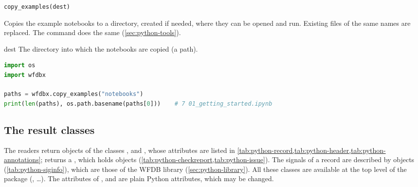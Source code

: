 \begin{lstlisting}[language=Python,style=signature]
copy_examples(dest)
\end{lstlisting}
Copies the example notebooks to a directory, created if needed, where they can be opened
and run. Existing files of the same names are replaced. The command  does the same (\cref{sec:python-tools}).
\begin{params}
\item[dest] The directory into which the notebooks are copied (a path).
\end{params}
\begin{lstlisting}[language=Python,style=example]
import os
import wfdbx

paths = wfdbx.copy_examples("notebooks")
print(len(paths), os.path.basename(paths[0]))    # 7 01_getting_started.ipynb
\end{lstlisting}

\subsection{The result classes}
\label{sec:python-results}

The readers return objects of the classes ,  and
, whose attributes are listed in
\cref{tab:python-record,tab:python-header,tab:python-annotations}; 
returns a , which holds  objects
(\cref{tab:python-checkreport,tab:python-issue}). The signals of a record are described
by  objects (\cref{tab:python-siginfo}), which are those of the WFDB library
(\cref{sec:python-library}). All these classes are available at the top level of the
package (, \ldots). The attributes of ,  and
 are plain Python attributes, which may be changed.

